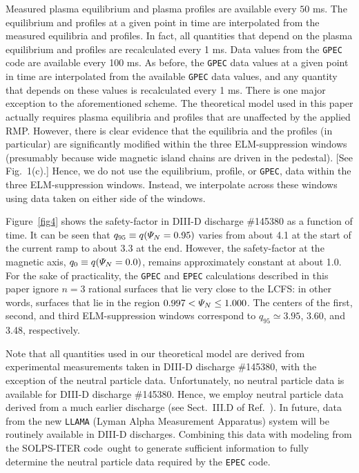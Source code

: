 \documentclass[12pt,prb,aps]{revtex4-1}
\begin{document}
Measured plasma equilibrium and
plasma profiles are available every $50$ ms. The equilibrium and profiles  at a given point in time are interpolated from
the measured equilibria and profiles. In fact, all quantities that depend on the plasma equilibrium and profiles are recalculated every 1 ms.  Data values from the
{\tt GPEC} code are available every 100 ms. As before, the {\tt GPEC} data values at a given point in time are interpolated from the
available {\tt GPEC} data values, and any quantity that depends on these values is recalculated every 1 ms. There is one major exception to
the aforementioned scheme. The theoretical model used in this paper actually requires plasma equilibria and profiles that are unaffected
by the applied RMP. However, there is clear evidence that the equilibria and the profiles (in particular) are significantly modified
within the three ELM-suppression windows (presumably because wide magnetic island chains are driven in the pedestal). [See Fig.~1(c).]
Hence, we do not use the equilibrium, profile, or {\tt GPEC}, data within the three ELM-suppression windows. Instead, we
interpolate across these windows using data taken on either side of the windows. 

Figure~\ref{fig4} shows the safety-factor in DIII-D discharge \#145380 as a function of time. It can be seen
that $q_{95}\equiv q({\mit\Psi}_N=0.95)$ varies from about 4.1 at the start of the current ramp to about 3.3
at the end. However, the safety-factor at the magnetic axis, $q_0 \equiv q({\mit\Psi}_N=0.0)$, remains approximately
constant at about 1.0. For the sake of practicality,  the {\tt GPEC} and {\tt EPEC} calculations described in this paper ignore $n=3$ rational
surfaces that lie very close to the LCFS: in other words,  surfaces that lie in the region $0.997 < {\mit\Psi}_N\leq 1.000$. The centers of the
first, second, and third ELM-suppression windows correspond to $q_{95}\simeq 3.95$, 3.60, and 3.48, respectively. 

Note that all quantities used in our theoretical model are derived from experimental measurements taken in DIII-D discharge \#145380, with the exception of the neutral particle data. 
Unfortunately, no neutral particle data is available for DIII-D discharge \#145380.
Hence, we employ neutral particle data derived from a much earlier discharge (see Sect.~III.D of Ref.~).\cite{neutral}
In future, data from the new {\tt LLAMA} (Lyman Alpha Measurement Apparatus) system will be routinely available in DIII-D discharges.\cite{llama}
Combining this data  with modeling from the SOLPS-ITER code\,\cite{solps} ought to generate sufficient information to fully determine the
neutral particle data required by the {\tt EPEC} code.  
\end{document}

